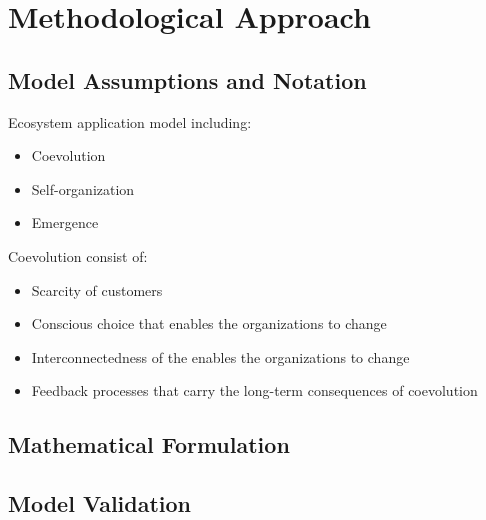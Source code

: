 \section{Methodological Approach} %
\label{sec:methodological_approach}

\subsection{Model Assumptions and Notation} %
\label{sub:model_assumptions}
Ecosystem application model including:

\begin{itemize}
	\item Coevolution
	\item Self-organization
	\item Emergence	
\end{itemize}

Coevolution consist of:
\begin{itemize}
	\item Scarcity of customers
	\item Conscious choice that enables the organizations to change
	\item Interconnectedness of the enables the organizations to change
	\item Feedback processes that carry the long-term consequences of coevolution
\end{itemize}

\subsection{Mathematical Formulation} %
\label{sub:mathematical_formulation}


\subsection{Model Validation} %
\label{sub:model_validation}


